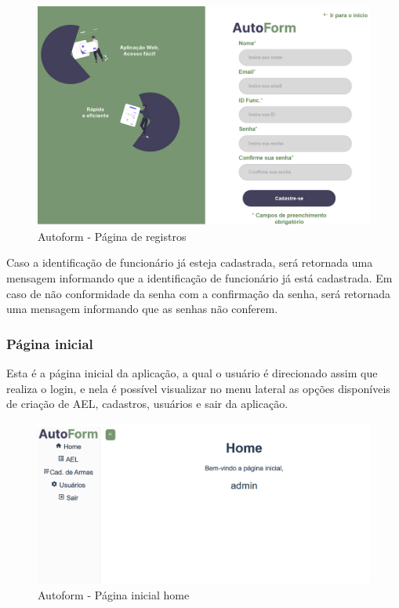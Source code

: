 \begin{figure}[htb]
    \caption{\label{fig:tela-registro}Autoform - Página de registros}
    \begin{center}
        \includegraphics[scale=0.6]{imagens/registro-autoform.png}   
     \end{center}
\end{figure}
Caso a identificação de funcionário já esteja cadastrada, será retornada uma mensagem informando que a identificação de funcionário já está cadastrada.
Em caso de não conformidade da senha com a confirmação da senha, será retornada uma mensagem informando que as senhas não conferem.

\subsubsection{Página inicial}
Esta é a página inicial da aplicação, a qual o usuário é direcionado assim que realiza o login, e nela é possível visualizar no menu lateral as opções disponíveis de criação de AEL, cadastros, usuários e sair da aplicação.

\begin{figure}[htb]
    \caption{\label{fig:tela-home}Autoform - Página inicial home}
    \begin{center}
        \includegraphics[scale=0.5]{imagens/home-autoform.png}
    \end{center}
\end{figure}

